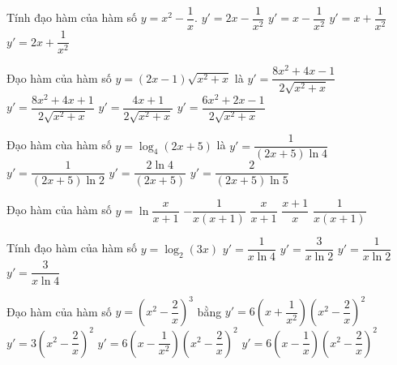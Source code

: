 \begin{ex}%
	Tính đạo  hàm của hàm số $y=x^2-\dfrac{1}{x}$.
	 \choice
		 {$y'=2x-\dfrac{1}{x^2}$}
		{$y'=x-\dfrac{1}{x^2}$} 
		 {$y'=x+\dfrac{1}{x^2}$}
		 {\True $y'=2x+\dfrac{1}{x^2}$}
\end{ex}

\begin{ex}%
	Đạo hàm của hàm  số $y=(2x-1)\sqrt{x^2+x}$ là
	\choice 
		{\True  $y'=\dfrac{8x^2+4x-1}{2\sqrt{x^2+x}}$}
		 {$y'=\dfrac{8x^2+4x+1}{2\sqrt{x^2+x}}$}
		 {$y'=\dfrac{4x+1}{2\sqrt{x^2+x}}$}
		{$y'=\dfrac{6x^2+2x-1}{2\sqrt{x^2+x}}$} 
\end{ex}

\begin{ex}%
	Đạo hàm cùa hàm  số $y=\log_4 (2x+5)$ là
	\choice 
		 {$y'=\dfrac{1}{(2x+5)\ln 4}$}
		{\True $y'=\dfrac{1}{(2x+5)\ln 2}$} 
		{$y'=\dfrac{2\ln  4}{(2x+5)}$}
		{$y'=\dfrac{2}{\left(2x+5\right)\ln 5}$} 
\end{ex}

\begin{ex}%
	Đạo hàm của hàm số  $y=\ln \dfrac{x}{x+1}$
	 \choice
		{$-\dfrac{1}{x\left(x+1\right)}$} 
		 {$\dfrac{x}{x+1}$}
		{$\dfrac{x+1}{x}$} 
		{\True $\dfrac{1}{x\left(x+1\right)}$} 
	\loigiai{ 
		\[y'=\left(\ln \dfrac{x}{x+1} \right)'=\dfrac{\dfrac{1}{\left(x+1\right)^2}}{\dfrac{x}{x+1}}=\dfrac{1}{x\left(x+1\right)}.\] 
	 }
\end{ex}

\begin{ex}%
	Tính đạo  hàm của hàm số $y=\log_2 (3x)$
	\choice 
		 {$y'=\dfrac{1}{x\ln 4}$}
		{$y'=\dfrac{3}{x\ln  2}$}
		{\True $y'=\dfrac{1}{x\ln 2}$} 
		{$y'=\dfrac{3}{x\ln 4}$} 
\end{ex}

\begin{ex}%
	Đạo hàm của hàm số  $y=\left(x^2-\dfrac{2}{x}\right)^3$ bằng
	 \choice
		{\True  $y'=6\left(x+\dfrac{1}{x^2}\right)\left(x^2-\dfrac{2}{x}\right)^2$}
		 {$y'=3\left(x^2-\dfrac{2}{x}\right)^2$}
		{$y'=6\left(x-\dfrac{1}{x^2}\right)\left(x^2-\dfrac{2}{x}\right)^2$} 
		{$y'=6\left(x-\dfrac{1}{x}\right)\left(x^2-\dfrac{2}{x}\right)^2$} 
\end{ex}

